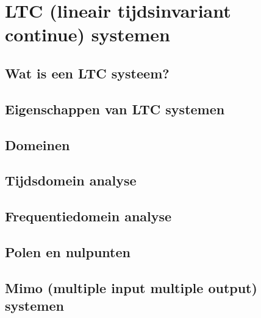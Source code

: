 \chapter{LTC (lineair tijdsinvariant continue) systemen}
\label{ch:ltc_systemen}

\section{Wat is een LTC systeem?}

\section{Eigenschappen van LTC systemen}


\section{Domeinen}

\section{Tijdsdomein analyse}

\section{Frequentiedomein analyse}

\section{Polen en nulpunten}


\section{Mimo (multiple input multiple output) systemen}



